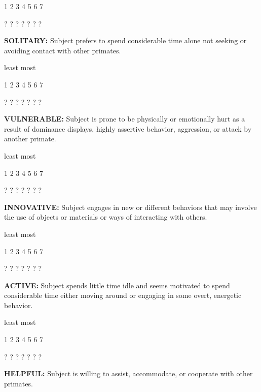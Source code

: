 \documentclass{article} %
\begin{document}
  1    2    3    4    5    6    7   

  ?    ?    ?    ?    ?    ?    ?   

\noindent  

\textbf{   }

\noindent \textbf{SOLITARY:} Subject prefers to spend considerable time alone not seeking or avoiding contact with other primates. 

\noindent  

\noindent least                            most

  1    2    3    4    5    6    7   

  ?    ?    ?    ?    ?    ?    ?   

\noindent  

\noindent \textbf{VULNERABLE:} Subject is prone to be physically or emotionally hurt as a result of dominance displays, highly assertive behavior, aggression, or attack by another primate. 

\noindent  

\noindent least                            most

  1    2    3    4    5    6    7   

  ?    ?    ?    ?    ?    ?    ?   

\noindent  

\noindent \textbf{INNOVATIVE:} Subject engages in new or different behaviors that may involve the use of objects or materials or ways of interacting with others. 

\noindent  

\noindent least                            most

  1    2    3    4    5    6    7   

  ?    ?    ?    ?    ?    ?    ?   

\noindent \textbf{ }

\noindent \textbf{ACTIVE:} Subject spends little time idle and seems motivated to spend considerable time either moving around or engaging in some overt, energetic behavior. 

\noindent  

\noindent least                            most

  1    2    3    4    5    6    7   

  ?    ?    ?    ?    ?    ?    ?   

\noindent \textbf{HELPFUL:} Subject is willing to assist, accommodate, or cooperate with other primates. 

\noindent  
\end{document}

